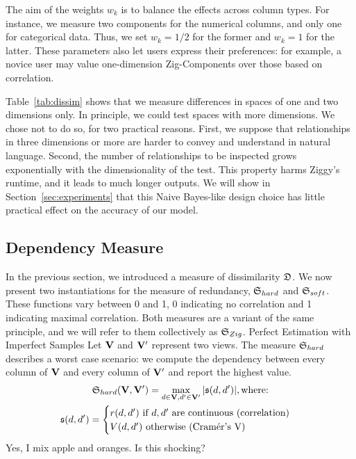 The aim of the weights $w_k$ is to balance the effects across column types. For
instance, we measure two components for the numerical columns, and only one for
categorical data.  Thus, we set $w_k = 1/2$ for the former and $w_k = 1$
for the latter.  These parameters also let users express their preferences: for
example, a novice user may value one-dimension Zig-Components over those based
on correlation.

Table~\ref{tab:dissim} shows that we measure differences in spaces of one and
two dimensions only.  In principle, we could test spaces with more dimensions.
We chose not to do so, for two practical reasons. First, we suppose that
relationships in three dimensions or more are harder to convey and understand
in natural language.  Second, the number of relationships to be inspected grows
exponentially with the dimensionality of the test. This property harms Ziggy's
runtime, and it leads to much longer outputs. We will show in
Section~\ref{sec:experiments} that this Naive Bayes-like design choice has little
practical effect on the accuracy of our model.


\subsection{Dependency Measure}
\label{sec:dependency}

In the previous section, we introduced a measure of dissimilarity $\mathfrak{D}$. We
now present two instantiations for the measure of redundancy, $\mathfrak{S}_{hard}$
and $\mathfrak{S}_{soft}$.  These functions vary between 0 and 1, 0 indicating no
correlation and 1 indicating maximal correlation. Both measures are a variant
of the same principle, and we will refer to them collectively as
$\mathfrak{S}_{Zig}$.
Perfect Estimation with Imperfect Samples
Let $\mathbf{V}$ and $\mathbf{V}'$ represent two views. The measure $\mathfrak{S}_{hard}$
describes a worst case scenario: we compute the dependency between every
column of $\mathbf{V}$ and every column of  $\mathbf{V}'$ and report the highest value.
\begin{gather}
    \mathfrak{S}_{hard}(\mathbf{V}, \mathbf{V}') = \max_{d \in \mathbf{V}, d' \in \mathbf{V}'}
    |\mathfrak{s}(d, d')|, \text{where:}\\
         \mathfrak{s}(d, d')= \begin{cases}
             r(d, d')\ \text{if $d, d'$ are continuous (correlation)}\\
             V(d, d')\ \text{otherwise (Cram\'er's V)}
         \end{cases}
\end{gather}
{\color{red} Yes, I mix apple and oranges. Is this shocking?}

